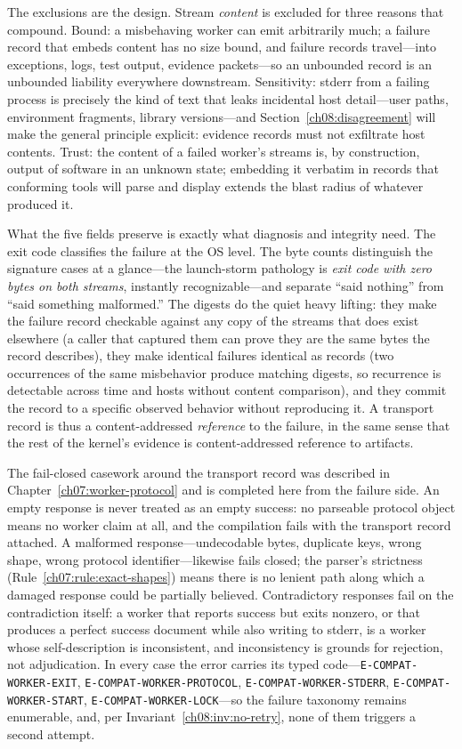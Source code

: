 The exclusions are the design. Stream \emph{content} is excluded for three reasons that compound. Bound: a misbehaving worker can emit arbitrarily much; a failure record that embeds content has no size bound, and failure records travel---into exceptions, logs, test output, evidence packets---so an unbounded record is an unbounded liability everywhere downstream. Sensitivity: stderr from a failing process is precisely the kind of text that leaks incidental host detail---user paths, environment fragments, library versions---and Section~\ref{ch08:disagreement} will make the general principle explicit: evidence records must not exfiltrate host contents. Trust: the content of a failed worker's streams is, by construction, output of software in an unknown state; embedding it verbatim in records that conforming tools will parse and display extends the blast radius of whatever produced it.

What the five fields preserve is exactly what diagnosis and integrity need. The exit code classifies the failure at the OS level. The byte counts distinguish the signature cases at a glance---the launch-storm pathology is \emph{exit code with zero bytes on both streams}, instantly recognizable---and separate ``said nothing'' from ``said something malformed.'' The digests do the quiet heavy lifting: they make the failure record checkable against any copy of the streams that does exist elsewhere (a caller that captured them can prove they are the same bytes the record describes), they make identical failures identical as records (two occurrences of the same misbehavior produce matching digests, so recurrence is detectable across time and hosts without content comparison), and they commit the record to a specific observed behavior without reproducing it. A transport record is thus a content-addressed \emph{reference} to the failure, in the same sense that the rest of the kernel's evidence is content-addressed reference to artifacts.

The fail-closed casework around the transport record was described in Chapter~\ref{ch07:worker-protocol} and is completed here from the failure side. An empty response is never treated as an empty success: no parseable protocol object means no worker claim at all, and the compilation fails with the transport record attached. A malformed response---undecodable bytes, duplicate keys, wrong shape, wrong protocol identifier---likewise fails closed; the parser's strictness (Rule~\ref{ch07:rule:exact-shapes}) means there is no lenient path along which a damaged response could be partially believed. Contradictory responses fail on the contradiction itself: a worker that reports success but exits nonzero, or that produces a perfect success document while also writing to stderr, is a worker whose self-description is inconsistent, and inconsistency is grounds for rejection, not adjudication. In every case the error carries its typed code---\texttt{E-COMPAT-WORKER-EXIT}, \texttt{E-COMPAT-WORKER-PROTOCOL}, \texttt{E-COMPAT-WORKER-STDERR}, \texttt{E-COMPAT-WORKER-START}, \texttt{E-COMPAT-WORKER-LOCK}---so the failure taxonomy remains enumerable, and, per Invariant~\ref{ch08:inv:no-retry}, none of them triggers a second attempt.

